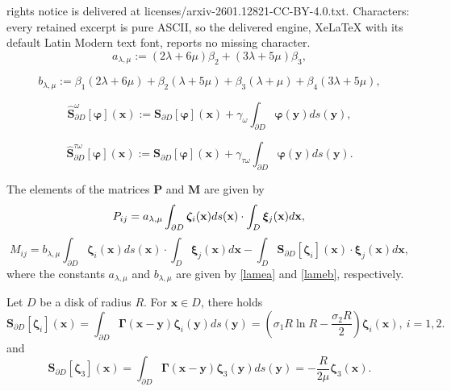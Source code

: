 \documentclass[10pt,a4paper]{amsart}
\begin{document}
rights notice is delivered at licenses/arxiv-2601.12821-CC-BY-4.0.txt. Characters: every retained excerpt is pure ASCII, so the delivered engine, XeLaTeX with its default Latin Modern text font, reports no missing character.
\begin{equation}\label{lamea}
a_{\lambda,\mu}:=(2\lambda+6\mu)\beta_2+(3\lambda+5\mu)\beta_3,
\end{equation}

\begin{equation}\label{lameb}
b_{\lambda,\mu}:=\beta_{1}(2\lambda+6\mu)+\beta_{2}(\lambda+5\mu)+\beta_{3}(\lambda+\mu)+\beta_{4}(3\lambda+5\mu),
\end{equation}

\begin{equation}\label{hats1}
\hat{\mathbf{S}}_{\partial D}^{\omega}[\boldsymbol{\varphi}](\mathbf{x}):=\mathbf{S}_{\partial D}[\boldsymbol{\varphi}](\mathbf{x})+\gamma_{\omega}\int_{\partial D}\boldsymbol{\varphi}(\mathbf{y})d s(\mathbf{y}),
\end{equation}

\begin{equation}\label{hats2}
\hat{\mathbf{S}}_{\partial D}^{\tau\omega}[\boldsymbol{\varphi}](\mathbf{x}):=\mathbf{S}_{\partial D}[\boldsymbol{\varphi}](\mathbf{x})+\gamma_{\tau\omega}\int_{\partial D}\boldsymbol{\varphi}(\mathbf{y})d s(\mathbf{y}).
\end{equation}

\begin{prop}\label{matrices p and m}
The elements of the matrices $\mathbf{P}$ and $\mathbf{M}$ are given by
$$
P_{ij}=a_{\lambda,\mu}\int_{ \partial D}\boldsymbol{\zeta}_i(\mathbf{x})ds(\mathbf{x})\cdot \int_{ D}\boldsymbol{\xi}_j(\mathbf{x})d\mathbf{x},\quad\\
$$
$$
M_{ij}={b}_{\lambda,\mu}\int_{ \partial D}\boldsymbol{\zeta}_i(\mathbf{x})ds(\mathbf{x}) \cdot\int_{ D}\boldsymbol{\xi}_j(\mathbf{x})d\mathbf{x}
-\int_{ D} {\mathbf{S}}_{\partial D}[\boldsymbol{\zeta}_i](\mathbf{x}) \cdot \boldsymbol{\xi}_j(\mathbf{x}) d\mathbf{x},
$$
where the constants ${a}_{\lambda,\mu}$ and ${b}_{\lambda,\mu}$ are given by \eqref{lamea} and \eqref{lameb}, respectively.
\end{prop}

\begin{lem}\label{disk singlelayer}
Let $D$ be a disk of radius $R$. For $\mathbf{x}\in D$, there holds
\begin{equation}\label{disk singlelayer1}
{\mathbf{S}}_{\partial D}[\boldsymbol{\zeta}_i](\mathbf{x})=\int_{\partial D} \boldsymbol{\Gamma}(\mathbf{x}-\mathbf{y}) \boldsymbol{\zeta}_i(\mathbf{y}) d s(\mathbf{y})=\left(\sigma_1R\ln R-\frac{\sigma_2R}{2}\right)\boldsymbol{\zeta}_i(\mathbf{x}),\ i=1,2.
\end{equation}
and
\begin{equation}\label{disk singlelayer2}
{\mathbf{S}}_{\partial D}[\boldsymbol{\zeta}_3](\mathbf{x})=\int_{\partial D} \boldsymbol{\Gamma}(\mathbf{x}-\mathbf{y}) \boldsymbol{\zeta}_3(\mathbf{y}) d s(\mathbf{y})={-\frac{R}{2\mu}}\boldsymbol{\zeta}_3(\mathbf{x}).
\end{equation}
\end{lem}
\end{document}

